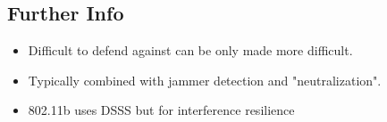 \subsection{Further Info}
\begin{itemize}
    \item Difficult to defend against can be only made more difficult.
    \item Typically combined with jammer detection and "neutralization".
    \item 802.11b uses DSSS but for interference resilience
\end{itemize}
